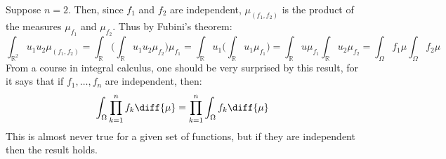     Suppose $n=2$. Then, since $f_{1}$ and $f_{2}$ are
    independent, $\mu_{(f_{1},f_{2})}$ is the product of
    the measures $\mu_{f_{1}}$ and $\mu_{f_{2}}$. Thus
    by Fubini's theorem:
    \begin{equation}
        \int_{\mathbb{R}^{2}}u_{1}u_{2}\mu_{(f_{1},f_{2})}
        =\int_{\mathbb{R}}\Big(
            \int_{\mathbb{R}}u_{1}u_{2}\mu_{f_{2}}\Big)
                \mu_{f_{1}}
        =\int_{\mathbb{R}}u_{1}\Big(
            \int_{\mathbb{R}}u_{1}\mu_{f_{1}}\Big)
        =\int_{\mathbb{R}}u\mu_{f_{1}}
            \int_{\mathbb{R}}u_{2}\mu_{f_{2}}
        =\int_{\Omega}f_{1}\mu\int_{\Omega}f_{2}\mu
    \end{equation}
    From a course in integral calculus, one should be very
    surprised by this result, for it says that if
    $f_{1},\dots,f_{n}$ are independent, then:
    \begin{equation}
        \int_{\Omega}\prod_{k=1}^{n}f_{k}\diff{\mu}=
        \prod_{k=1}^{n}\int_{\Omega}f_{k}\diff{\mu}
    \end{equation}
    This is almost never true for a given set of functions,
    but if they are independent then the result holds.
